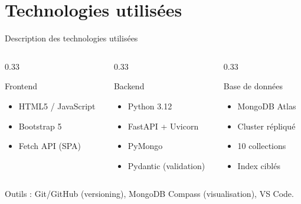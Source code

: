 \documentclass[aspectratio=169]{beamer}
\begin{document}
\section{Technologies utilisées}
\begin{frame}{Description des technologies utilisées}
  \begin{columns}[t]
    \begin{column}{0.33\textwidth}
      \begin{block}{Frontend}
        \begin{itemize}\footnotesize
          \item HTML5 / JavaScript
          \item Bootstrap 5
          \item Fetch API (SPA)
        \end{itemize}
      \end{block}
    \end{column}
    \begin{column}{0.33\textwidth}
      \begin{block}{Backend}
        \begin{itemize}\footnotesize
          \item Python 3.12
          \item FastAPI + Uvicorn
          \item PyMongo
          \item Pydantic (validation)
        \end{itemize}
      \end{block}
    \end{column}
    \begin{column}{0.33\textwidth}
      \begin{block}{Base de données}
        \begin{itemize}\footnotesize
          \item MongoDB Atlas
          \item Cluster répliqué
          \item 10 collections
          \item Index ciblés
        \end{itemize}
      \end{block}
    \end{column}
  \end{columns}
  \vspace{1em}
  \centering\footnotesize
  Outils : Git/GitHub (versioning), MongoDB Compass (visualisation), VS Code.
\end{frame}
\end{document}
